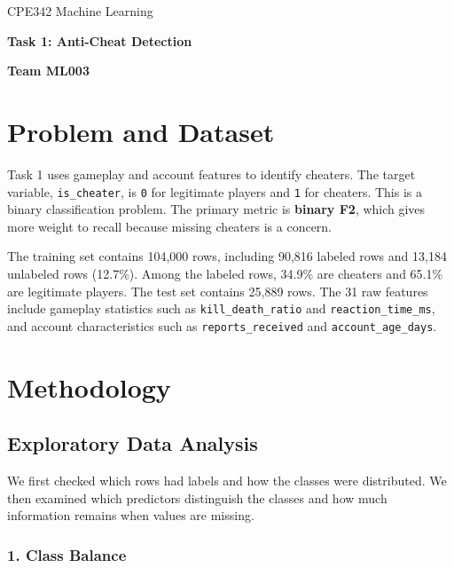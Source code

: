 \documentclass[11pt,a4paper]{article}
\newcommand{\reserveheading}[1]{\par\ifdim\dimexpr\pagegoal-\pagetotal\relax<#1\relax\newpage\fi}
\begin{document}
\raggedbottom
\begin{center}
CPE342 Machine Learning\par
\vspace{5pt}
{\Large\bfseries Task 1: Anti-Cheat Detection\par}
\vspace{5pt}
{\normalsize\bfseries Team ML003\par}
\end{center}
\vspace{6pt}

\section{Problem and Dataset}

Task 1 uses gameplay and account features to identify cheaters. The target variable, \texttt{is\_\allowbreak{}cheater}, is \texttt{0} for legitimate players and \texttt{1} for cheaters. This is a binary classification problem. The primary metric is \textbf{binary F2}, which gives more weight to recall because missing cheaters is a concern.

The training set contains 104,000 rows, including 90,816 labeled rows and 13,184 unlabeled rows (12.7\%). Among the labeled rows, 34.9\% are cheaters and 65.1\% are legitimate players. The test set contains 25,889 rows. The 31 raw features include gameplay statistics such as \texttt{kill\_\allowbreak{}death\_\allowbreak{}ratio} and \texttt{reaction\_\allowbreak{}time\_\allowbreak{}ms}, and account characteristics such as \texttt{reports\_\allowbreak{}received} and \texttt{account\_\allowbreak{}age\_\allowbreak{}days}.

\section{Methodology}

\subsection{Exploratory Data Analysis}

We first checked which rows had labels and how the classes were distributed. We then examined which predictors distinguish the classes and how much information remains when values are missing.

\reserveheading{6\baselineskip}
\subsubsection*{1. Class Balance}
\end{document}
